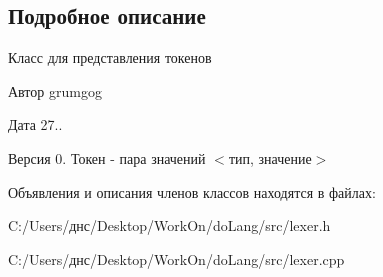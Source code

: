 \subsection{Подробное описание}
Класс для представления токенов 

\begin{DoxyAuthor}{Автор}
grumgog 
\end{DoxyAuthor}
\begin{DoxyDate}{Дата}
27.. 
\end{DoxyDate}
\begin{DoxyVersion}{Версия}
0. Токен -\/ пара значений $<$тип, значение$>$ 
\end{DoxyVersion}


Объявления и описания членов классов находятся в файлах\+:\begin{DoxyCompactItemize}
\item 
C\+:/\+Users/днс/\+Desktop/\+Work\+On/do\+Lang/src/lexer.\+h\item 
C\+:/\+Users/днс/\+Desktop/\+Work\+On/do\+Lang/src/lexer.\+cpp\end{DoxyCompactItemize}
